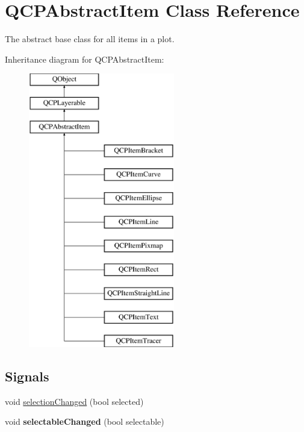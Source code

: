 \hypertarget{classQCPAbstractItem}{}\section{Q\+C\+P\+Abstract\+Item Class Reference}
\label{classQCPAbstractItem}


The abstract base class for all items in a plot.  


Inheritance diagram for Q\+C\+P\+Abstract\+Item\+:\begin{figure}[H]
\begin{center}
\leavevmode
\includegraphics[height=12.000000cm]{classQCPAbstractItem}
\end{center}
\end{figure}
\subsection*{Signals}
\begin{DoxyCompactItemize}
\item 
void \hyperlink{classQCPAbstractItem_aa5cffb034fc65dbb91c77e02c1c14251}{selection\+Changed} (bool selected)
\item 
\hypertarget{classQCPAbstractItem_a5b266c11aac61cb511901f3911dac2a3}{}void {\bfseries selectable\+Changed} (bool selectable)\label{classQCPAbstractItem_a5b266c11aac61cb511901f3911dac2a3}

\end{DoxyCompactItemize}
